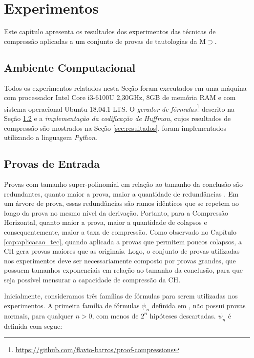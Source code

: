 
\chapter{Experimentos}
\label{cap:experimentos}

Este capítulo apresenta os resultados dos experimentos das técnicas de compressão aplicadas a um conjunto de provas de tautologias da M$\supset$.

\section{Ambiente Computacional}

Todos os experimentos relatados nesta Seção foram executados em uma máquina com processador Intel Core i3-6100U 2,30GHz, 8GB de memória RAM e com sistema operacional Ubuntu 18.04.1 LTS. O \textit{gerador de fórmulas}\footnote{\label{ftn:impl_ger_huff}\href{https://github.com/flavio-barros/proof-compressions}{https://github.com/flavio-barros/proof-compressions}} descrito na Seção \ref{sec:base_dados} e a \textit{implementação da codificação de Huffman}, cujos resultados de compressão são mostrados na Seção \ref{sec:resultados}, foram implementados utilizando a linguagem \textit{Python}.

\section{Provas de Entrada}
\label{sec:base_dados}

Provas com tamanho super-polinomial em relação ao tamanho da conclusão são redundantes, quanto maior a prova, maior a quantidade de redundâncias \cite{GorHae2019}. Em um árvore de prova, essas redundâncias são ramos idênticos que se repetem ao longo da prova no mesmo nível da derivação. Portanto, para a Compressão Horizontal, quanto maior a prova, maior a quantidade de colapsos e consequentemente, maior a taxa de compressão. Como observado no Capítulo \ref{cap:aplicacao_tec}, quando aplicada a provas que permitem poucos colapsos, a CH gera provas maiores que as originais. Logo, o conjunto de provas utilizadas nos experimentos deve ser necessariamente composto por provas grandes, que possuem tamanhos exponenciais em relação ao tamanho da conclusão, para que seja possível mensurar a capacidade de compressão da CH.

Inicialmente, consideramos três famílias de fórmulas para serem utilizadas nos experimentos. A primeira família de fórmulas $\psi_{n}$ definida em \cite{haeusler2015many}, não possui provas normais, para qualquer $n > 0$, com menos de $2^n$ hipóteses descartadas. $\psi_{n}$ é definida com segue:

